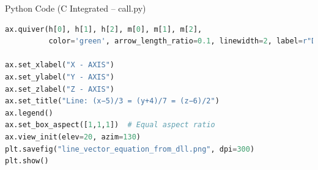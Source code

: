 \documentclass{beamer}
\begin{document}
\begin{frame}[fragile]{Python Code (C Integrated – call.py)
}
\begin{lstlisting}[language=Python]
ax.quiver(h[0], h[1], h[2], m[0], m[1], m[2],
          color='green', arrow_length_ratio=0.1, linewidth=2, label=r"Direction $\vec{m}(3,7,2)$")

ax.set_xlabel("X - AXIS")
ax.set_ylabel("Y - AXIS")
ax.set_zlabel("Z - AXIS")
ax.set_title("Line: (x−5)/3 = (y+4)/7 = (z−6)/2")
ax.legend()
ax.set_box_aspect([1,1,1])  # Equal aspect ratio
ax.view_init(elev=20, azim=130)
plt.savefig("line_vector_equation_from_dll.png", dpi=300)
plt.show()
\end{lstlisting}
\end{frame}
\end{document}
